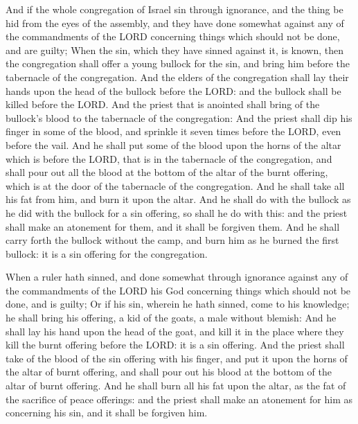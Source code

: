  And if the whole congregation of Israel sin through
ignorance, and the thing be hid from the eyes of the assembly, and they
have done somewhat against any of the commandments of the LORD
concerning things which should not be done, and are guilty;
 When the sin, which they have sinned against it, is
known, then the congregation shall offer a young bullock for the sin,
and bring him before the tabernacle of the congregation. 
And the elders of the congregation shall lay their hands upon the head
of the bullock before the LORD: and the bullock shall be killed before
the LORD.  And the priest that is anointed shall bring of
the bullock's blood to the tabernacle of the congregation:
 And the priest shall dip his finger in some of the
blood, and sprinkle it seven times before the LORD, even before the
vail.  And he shall put some of the blood upon the horns
of the altar which is before the LORD, that is in the tabernacle of the
congregation, and shall pour out all the blood at the bottom of the
altar of the burnt offering, which is at the door of the tabernacle of
the congregation.  And he shall take all his fat from
him, and burn it upon the altar.  And he shall do with
the bullock as he did with the bullock for a sin offering, so shall he
do with this: and the priest shall make an atonement for them, and it
shall be forgiven them.  And he shall carry forth the
bullock without the camp, and burn him as he burned the first bullock:
it is a sin offering for the congregation.

 When a ruler hath sinned, and done somewhat through
ignorance against any of the commandments of the LORD his God concerning
things which should not be done, and is guilty;  Or if
his sin, wherein he hath sinned, come to his knowledge; he shall bring
his offering, a kid of the goats, a male without blemish:
 And he shall lay his hand upon the head of the goat, and
kill it in the place where they kill the burnt offering before the LORD:
it is a sin offering.  And the priest shall take of the
blood of the sin offering with his finger, and put it upon the horns of
the altar of burnt offering, and shall pour out his blood at the bottom
of the altar of burnt offering.  And he shall burn all
his fat upon the altar, as the fat of the sacrifice of peace offerings:
and the priest shall make an atonement for him as concerning his sin,
and it shall be forgiven him.

